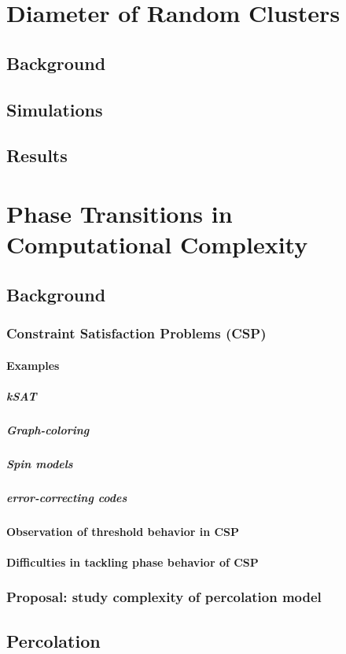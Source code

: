 \documentclass{article}
\begin{document}
\section{Diameter of Random Clusters}
\label{sec-3}
\subsection{Background}
\label{sec-3.1}
\subsection{Simulations}
\label{sec-3.2}
\subsection{Results}
\label{sec-3.3}
\section{Phase Transitions in Computational Complexity}
\label{sec-4}
\subsection{Background}
\label{sec-4.1}
\subsubsection{Constraint Satisfaction Problems (CSP)}
\label{sec-4.1.1}
\paragraph{Examples}
\label{sec-4.1.1.1}
\subparagraph{kSAT}
\label{sec-4.1.1.1.1}
\subparagraph{Graph-coloring}
\label{sec-4.1.1.1.2}
\subparagraph{Spin models}
\label{sec-4.1.1.1.3}
\subparagraph{error-correcting codes}
\label{sec-4.1.1.1.4}
\paragraph{Observation of threshold behavior in CSP}
\label{sec-4.1.1.2}
\paragraph{Difficulties in tackling phase behavior of CSP}
\label{sec-4.1.1.3}
\subsubsection{Proposal: study complexity of percolation model}
\label{sec-4.1.2}
\subsection{Percolation}
\label{sec-4.2}
\end{document}
